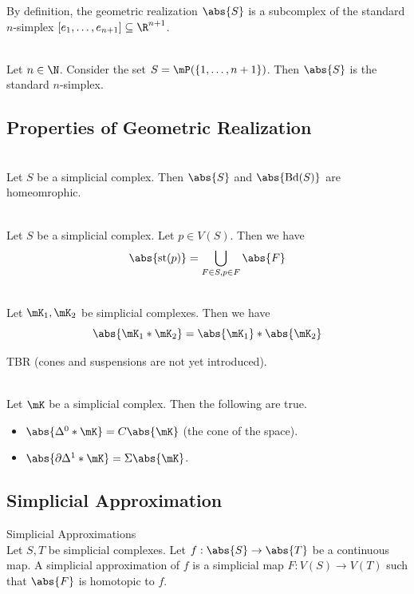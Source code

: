 \documentclass[a4paper]{article}
\begin{document}
By definition, the geometric realization $\abs{S}$ is a subcomplex of the standard $n$-simplex $[e_1,\dots,e_{n+1}]\subseteq\R^{n+1}$. 

\begin{eg}{}{}\\
Let $n\in\N$. Consider the set $S=\mP(\{1,\dots,n+1\})$. Then $\abs{S}$ is the standard $n$-simplex. 
\end{eg}

\subsection{Properties of Geometric Realization}
\begin{lmm}{}{}\\
Let $S$ be a simplicial complex. Then $\abs{S}$ and $\abs{\text{Bd}(S)}$ are homeomrophic. 
\end{lmm}

\begin{lmm}{}{}\\
Let $S$ be a simplicial complex. Let $p\in V(S)$. Then we have $$\abs{\text{st}(p)}=\bigcup_{F\in S, p\in F}\abs{F}$$
\end{lmm}

\begin{lmm}{}{}\\
Let $\mK_1,\mK_2$ be simplicial complexes. Then we have $$\abs{\mK_1\ast\mK_2}=\abs{\mK_1}\ast\abs{\mK_2}$$
\end{lmm}

TBR (cones and suspensions are not yet introduced). 
\begin{crl}{}{}\\
Let $\mK$ be a simplicial complex. Then the following are true. 
\begin{itemize}
\item $\abs{\Delta^0\ast\mK}=C\abs{\mK}$ (the cone of the space). 
\item $\abs{\partial\Delta^1\ast\mK}=\Sigma\abs{\mK}$. 
\end{itemize}
\end{crl}

\subsection{Simplicial Approximation}
\begin{defn}{Simplicial Approximations}{}\\
Let $S,T$ be simplicial complexes. Let $f:\abs{S}\to\abs{T}$ be a continuous map. A simplicial approximation of $f$ is a simplicial map $F:V(S)\to V(T)$ such that $\abs{F}$ is homotopic to $f$. 
\end{defn}
\end{document}
